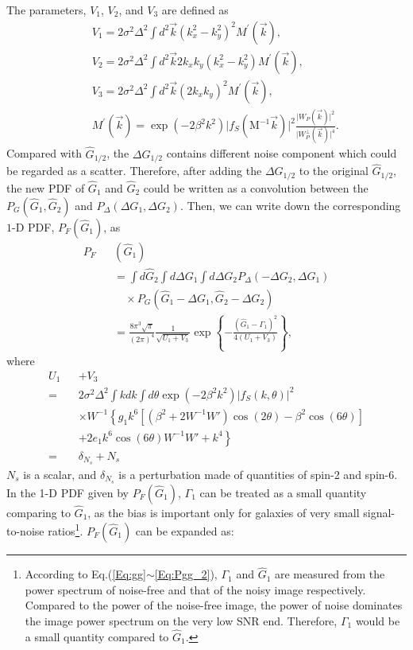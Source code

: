 \documentclass[twocolumn]{aastex62}
\begin{document}
The parameters, $V_1$, $V_2$, and $V_3$ are defined as
\begin{eqnarray}
&&V_1 = 2\sigma^2\Delta^2\int{d}^2\vec{k}\left(k_x^2-k_y^2\right)^2 M^\prime(\vec{k}),\\ \nonumber
&&V_2 = 2\sigma^2\Delta^2\int{d}^2\vec{k}2k_xk_y\left(k_x^2-k_y^2\right)M^\prime(\vec{k}),\\ \nonumber
&&V_3 = 2\sigma^2\Delta^2\int{d}^2\vec{k}(2k_xk_y)^2 M^\prime(\vec{k}),\\ \nonumber
&&M^\prime(\vec{k})=\exp(-2\beta^2k^2)\vert f_S(\mathrm{M}^{-1}\vec{k})\vert^2\frac{\vert W_{P}(\vec{k})\vert^2}{\vert W_{P}^{\perp}(\vec{k})\vert^4}.
\end{eqnarray}
Compared with $\hat{G}_{1/2}$, the $\Delta G_{1/2}$ contains different noise component which could be regarded as a scatter. Therefore, after adding the $\Delta G_{1/2}$ to the original $\hat{G}_{1/2}$, the new PDF of $\hat{G}_1$ and $\hat{G}_2$ could be written as a convolution between the $P_G(\hat{G}_1,\hat{G}_2)$ and $P_{\Delta}(\Delta G_1,\Delta G_2)$. Then, we can write down the corresponding $1$-D PDF, $P_F(\hat{G}_1)$, as
\begin{eqnarray}
P_F&&(\hat{G}_1)\\ \nonumber
&&=\int d\hat{G}_2\int d\Delta G_1\int d\Delta G_2  P_{\Delta}(-\Delta G_2,\Delta G_1)\\ \nonumber 
&&\quad \times P_G(\hat{G}_1-\Delta G_1,\hat{G}_2-\Delta G_2)\\ \nonumber
&&=\frac{8\pi^3\sqrt{\pi}}{(2\pi)^4}\frac{1}{\sqrt{U_1+V_3}}\exp\left\{-\frac{(\hat{G}_1-\Gamma_1)^2}{4(U_1+V_3)}\right\},
\end{eqnarray}
where
\begin{eqnarray}
U_1&& + V_3\\ \nonumber
=&&2\sigma^2\Delta^2\int kdk\int d\theta\exp(-2\beta^2k^2)\vert f_S(k,\theta)\vert^2\\ \nonumber
&&\times W^{-1}\left\{{g_1k^6[(\beta^2+2W^{-1}W')\cos(2\theta)-\beta^2\cos(6\theta)]}\right.\\ \nonumber
&&\left.{+2e_1k^6\cos(6\theta)W^{-1}W'+k^4}\right\} \\ \nonumber
=&&\delta_{N_s}+N_s
\end{eqnarray}
$N_s$ is a scalar, and $\delta_{N_s}$ is a perturbation made of quantities of spin-2 and spin-6. In the 1-D PDF given by $P_F(\hat{G}_1)$, $\Gamma_1$ can be treated as a small quantity comparing to $\hat{G}_1$, as the bias is important only for galaxies of very small signal-to-noise ratios\footnote{According to Eq.(\ref{Eq:gg}$\sim$\ref{Eq:Pgg_2}), $\Gamma_1$ and $\hat{G}_1$ are measured from the power spectrum of noise-free and that of the noisy image respectively. Compared to the power of the noise-free image, the power of noise dominates the image power spectrum on the very low SNR end. Therefore, $\Gamma_1$ would be a small quantity compared to $\hat{G}_1$.}. $P_F(\hat{G}_1)$ can be expanded as:
\end{document}
